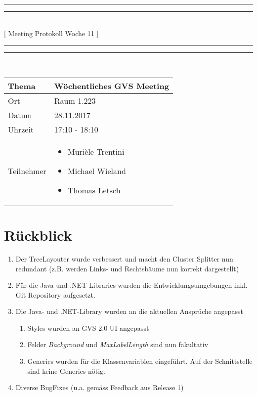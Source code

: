 \documentclass[11pt, a4paper,oneside]{scrartcl}
\begin{document}
	\centering
	\rule{\textwidth}{1.6pt}\vspace*{-\baselineskip}\vspace*{2pt} %
	\rule{\textwidth}{0.4pt}\\[\baselineskip] %
	{\LARGE [ Meeting Protokoll Woche 11 ]}\\[0.2\baselineskip] %
	\rule{\textwidth}{0.4pt}\vspace*{-\baselineskip}\vspace{3.2pt} %
	\rule{\textwidth}{1.6pt}\\[2\baselineskip] %
	
	\begin{tabu} to \linewidth {l X }
		\toprule
		\textbf{Thema} & \textbf{Wöchentliches GVS Meeting} \\
		\midrule
		Ort & Raum 1.223 \\
		Datum & 28.11.2017  \\
		Uhrzeit &  17:10 - 18:10 \\
		Teilnehmer & 
		\begin{minipage}[t]{\textwidth}
			\begin{itemize}
				\item Murièle Trentini
				\item Michael Wieland
				\item Thomas Letsch
			\end{itemize}
		\end{minipage}
		\\
		\bottomrule
	\end{tabu}
	
	
	\section{Rückblick}
	\begin{enumerate}
		\item Der TreeLayouter wurde verbessert und macht den Cluster Splitter nun redundant (z.B. werden Links- und Rechtsbäume nun korrekt dargestellt)
		\item Für die Java und .NET Libraries wurden die Entwicklungsumgebungen inkl. Git Repository aufgesetzt.
		\item Die Java- und .NET-Library wurden an die aktuellen Ansprüche angepasst
		\begin{enumerate}
			\item Styles wurden an GVS 2.0 UI angepasst
			\item Felder \textit{Background} und \textit{MaxLabelLength} sind nun fakultativ
			\item Generics wurden für die Klassenvariablen eingeführt. Auf der Schnittstelle sind keine Generics nötig.
		\end{enumerate}
	\item Diverse BugFixes (u.a. gemäss Feedback aus Release 1)
	\end{enumerate}
	
\end{document}
